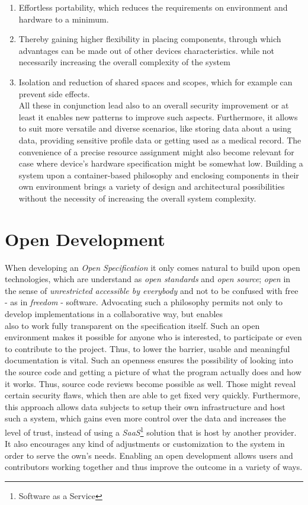 \documentclass[12pt,english,a4paper,titlepage,cleardoublepage=empty,dottedtoc]{report}
\providecommand{\tightlist}{%
  \setlength{\itemsep}{0pt}\setlength{\parskip}{0pt}}
\begin{document}
\begin{enumerate}
\def\labelenumi{(\Alph{enumi})}
\tightlist
\item
  Effortless portability, which reduces the requirements on environment
  and hardware to a minimum.
\item
  Thereby gaining higher flexibility in placing components, through
  which advantages can be made out of other devices characteristics.
  while not necessarily increasing the overall complexity of the system
\item
  Isolation and reduction of shared spaces and scopes, which for example
  can prevent side effects.\\
  All these in conjunction lead also to an overall security improvement
  or at least it enables new patterns to improve such aspects.
  Furthermore, it allows to suit more versatile and diverse scenarios,
  like storing data about a using data, providing sensitive profile data
  or getting used as a medical record. The convenience of a precise
  resource assignment might also become relevant for case where device's
  hardware specification might be somewhat low. Building a system upon a
  container-based philosophy and enclosing components in their own
  environment brings a variety of design and architectural possibilities
  without the necessity of increasing the overall system complexity.
\end{enumerate}

\section{Open Development}\label{open-development}

When developing an \emph{Open Specification} it only comes natural to
build upon open technologies, which are understand as \emph{open
standards} and \emph{open source}; \emph{open} in the sense of
\emph{unrestricted accessible by everybody} and not to be confused with
free - as in \emph{freedom} - software. Advocating such a philosophy
permits not only to develop implementations in a collaborative way, but
enables\\
also to work fully transparent on the specification itself. Such an open
environment makes it possible for anyone who is interested, to
participate or even to contribute to the project. Thus, to lower the
barrier, usable and meaningful documentation is vital. Such an openness
ensures the possibility of looking into the source code and getting a
picture of what the program actually does and how it works. Thus, source
code reviews become possible as well. Those might reveal certain
security flaws, which then are able to get fixed very quickly.
Furthermore, this approach allows data subjects to setup their own
infrastructure and host such a system, which gains even more control
over the data and increases the level of trust, instead of using a
\emph{SaaS}\footnote{Software as a Service} solution that is host by
another provider. It also encourages any kind of adjustments or
customization to the system in order to serve the own's needs. Enabling
an open development allows users and contributors working together and
thus improve the outcome in a variety of ways.
\end{document}
